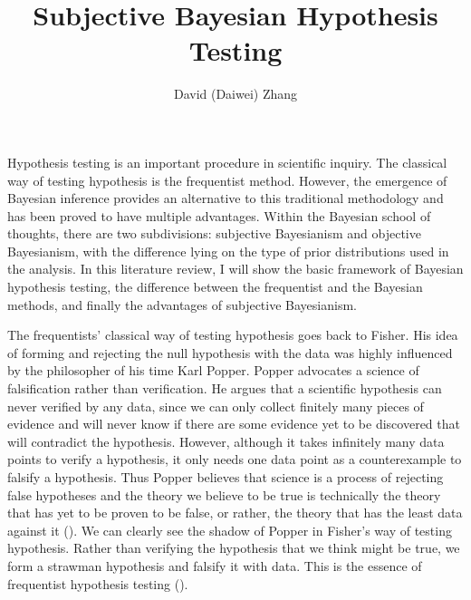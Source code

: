 \documentclass[12pt]{article} \usepackage[nolists]{endfloat}
\begin{document}
\setlength{\textheight}{625pt} \setlength{\baselineskip}{23pt}

\title{Subjective Bayesian Hypothesis Testing} \author{David (Daiwei)
  Zhang}
\maketitle

\noindent
Hypothesis testing is an important procedure in scientific
inquiry. The classical way of testing hypothesis is the frequentist
method.  However, the emergence of Bayesian inference provides an
alternative to this traditional methodology and has been proved to have
multiple advantages.  Within the Bayesian school of thoughts, there are
two subdivisions: subjective Bayesianism and objective Bayesianism,
with the difference lying on the type of prior distributions used in the analysis.  In
this literature review, I will show the basic framework of Bayesian
hypothesis testing, the difference between the frequentist and the
Bayesian methods, and finally the advantages of subjective Bayesianism.

The frequentists' classical way of testing hypothesis goes back to
Fisher.  His idea of forming and rejecting the null hypothesis with
the data was highly influenced by the philosopher of his time Karl Popper.  Popper
advocates a science of falsification rather than verification.  He
argues that a scientific hypothesis can never verified by any data,
since we can only collect finitely many pieces of evidence and will
never know if there are some evidence yet to be discovered that will
contradict the hypothesis.  However, although it takes infinitely many
data points to verify a hypothesis, it only needs one data point as a
counterexample to falsify a hypothesis.  Thus Popper believes that
science is a process of rejecting false hypotheses and the theory we
believe to be true is technically the theory that has yet to be proven
to be false, or rather, the theory that has the least data against it
(\cite{thornton}).  We can clearly see the shadow of Popper in
Fisher's way of testing hypothesis.  Rather than verifying the
hypothesis that we think might be true, we form a strawman hypothesis
and falsify it with data.  This is the essence of frequentist
hypothesis testing (\cite{press}).
\end{document}
